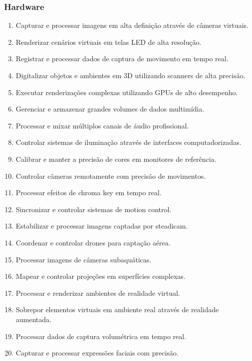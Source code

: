 \subsubsection{Hardware}
\begin{enumerate}
 \item Capturar e processar imagens em alta definição através de câmeras virtuais.
 \item Renderizar cenários virtuais em telas LED de alta resolução.
 \item Registrar e processar dados de captura de movimento em tempo real.
 \item Digitalizar objetos e ambientes em 3D utilizando scanners de alta precisão.
 \item Executar renderizações complexas utilizando GPUs de alto desempenho.
 \item Gerenciar e armazenar grandes volumes de dados multimídia.
 \item Processar e mixar múltiplos canais de áudio profissional.
 \item Controlar sistemas de iluminação através de interfaces computadorizadas.
 \item Calibrar e manter a precisão de cores em monitores de referência.
 \item Controlar câmeras remotamente com precisão de movimentos.
 \item Processar efeitos de chroma key em tempo real.
 \item Sincronizar e controlar sistemas de motion control.
 \item Estabilizar e processar imagens captadas por steadicam.
 \item Coordenar e controlar drones para captação aérea.
 \item Processar imagens de câmeras subaquáticas.
 \item Mapear e controlar projeções em superfícies complexas.
 \item Processar e renderizar ambientes de realidade virtual.
 \item Sobrepor elementos virtuais em ambiente real através de realidade aumentada.
 \item Processar dados de captura volumétrica em tempo real.
 \item Capturar e processar expressões faciais com precisão.
\end{enumerate}

